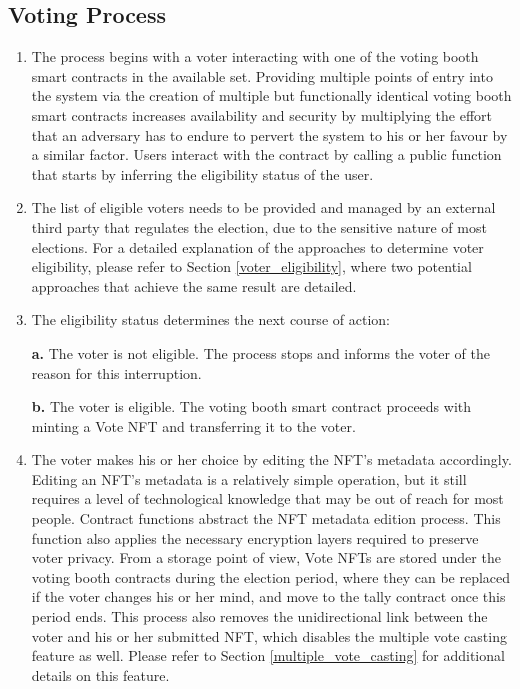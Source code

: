 \documentclass[../main.tex]{subfiles}
\begin{document}
\subsection{Voting Process}
\begin{enumerate}
    \item{The process begins with a voter interacting with one of the voting booth smart contracts in the available set. Providing multiple points of entry into the system via the creation of multiple but functionally identical voting booth smart contracts increases availability and security by multiplying the effort that an adversary has to endure to pervert the system to his or her favour by a similar factor. Users interact with the contract by calling a public function that starts by inferring the eligibility status of the user.}

    \item{The list of eligible voters needs to be provided and managed by an external third party that regulates the election, due to the sensitive nature of most elections. For a detailed explanation of the approaches to determine voter eligibility, please refer to Section \ref{voter_eligibility}, where two potential approaches that achieve the same result are detailed.}

    \item{The eligibility status determines the next course of action:
          \par
          \textbf{a.} The voter is not eligible. The process stops and informs the voter of the reason for this interruption.
          \par
          \textbf{b.} The voter is eligible. The voting booth smart contract proceeds with minting a Vote NFT and transferring it to the voter.}

    \item{The voter makes his or her choice by editing the NFT's metadata accordingly. Editing an NFT's metadata is a relatively simple operation, but it still requires a level of technological knowledge that may be out of reach for most people. Contract functions abstract the NFT metadata edition process. This function also applies the necessary encryption layers required to preserve voter privacy. From a storage point of view, Vote NFTs are stored under the voting booth contracts during the election period, where they can be replaced if the voter changes his or her mind, and move to the tally contract once this period ends. This process also removes the unidirectional link between the voter and his or her submitted NFT, which disables the multiple vote casting feature as well. Please refer to Section \ref{multiple_vote_casting} for additional details on this feature.}


\end{enumerate}
\end{document}
